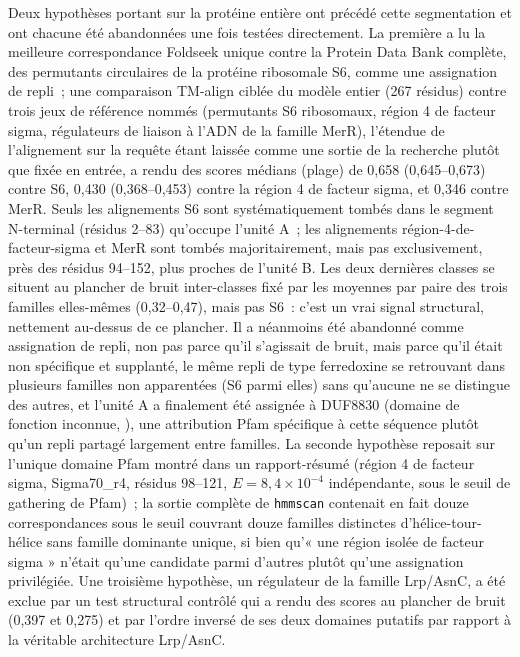\documentclass[11pt,a4paper]{article}
\begin{document}
Deux hypothèses portant sur la protéine entière ont précédé cette segmentation et ont chacune été
abandonnées une fois testées directement. La première a lu la meilleure correspondance Foldseek
unique contre la Protein Data Bank complète, des permutants circulaires de la protéine ribosomale
S6, comme une assignation de repli~; une comparaison TM-align ciblée du modèle entier (267 résidus)
contre trois jeux de référence nommés (permutants S6 ribosomaux, région 4 de facteur sigma,
régulateurs de liaison à l'ADN de la famille MerR), l'étendue de l'alignement sur la requête étant
laissée comme une sortie de la recherche plutôt que fixée en entrée, a rendu des scores médians
(plage) de 0,658 (0,645--0,673) contre S6, 0,430 (0,368--0,453) contre la région 4 de facteur sigma,
et 0,346 contre MerR. Seuls les alignements S6 sont systématiquement tombés dans le segment
N-terminal (résidus 2--83) qu'occupe l'unité A~; les alignements région-4-de-facteur-sigma et MerR
sont tombés majoritairement, mais pas exclusivement, près des résidus 94--152, plus proches de
l'unité B. Les deux dernières classes se situent au plancher de bruit
inter-classes fixé par les moyennes par paire des trois familles elles-mêmes (0,32--0,47), mais pas
S6~: c'est un vrai signal structural, nettement au-dessus de ce plancher. Il a néanmoins été
abandonné comme assignation de repli, non pas parce qu'il s'agissait de bruit, mais parce qu'il
était non spécifique et supplanté, le même repli de type ferredoxine se retrouvant dans plusieurs
familles non apparentées (S6 parmi elles) sans qu'aucune ne se distingue des autres, et l'unité A a
finalement été assignée à DUF8830 (domaine de fonction inconnue, ), une
attribution Pfam spécifique à cette séquence plutôt qu'un repli partagé largement entre familles. La
seconde hypothèse reposait sur l'unique domaine Pfam montré dans un rapport-résumé (région 4 de
facteur sigma, Sigma70\_r4, résidus 98--121, $E=8,4\times10^{-4}$ indépendante, sous le seuil de
gathering de Pfam)~; la sortie complète de \texttt{hmmscan} contenait en fait douze correspondances
sous le seuil couvrant douze familles distinctes d'hélice-tour-hélice sans famille dominante
unique, si bien qu'« une région isolée de facteur sigma » n'était qu'une candidate parmi d'autres
plutôt qu'une assignation privilégiée. Une troisième hypothèse, un régulateur de la famille
Lrp/AsnC, a été exclue par un test structural contrôlé qui a rendu des scores au plancher de bruit
(0,397 et 0,275) et par l'ordre inversé de ses deux domaines putatifs par rapport à la véritable
architecture Lrp/AsnC.
\end{document}
